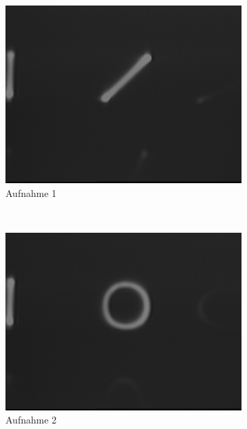 \documentclass[bigchapter,colorback,accentcolor=tud4b,linedtoc,11pt]{tudreport}
\begin{document}
\begin{figure}[H]
  \centering
  \begin{subfigure}[h]{0.32\textwidth}
    \includegraphics[width=\textwidth]{data/Aufgabe7/1-1-0.png}
    \caption[Cap for listoffigures]{Aufnahme 1}
  \end{subfigure}~%
  \begin{subfigure}[h]{0.32\textwidth}
    \includegraphics[width=\textwidth]{data/Aufgabe7/1-1-90.png}
    \caption[Cap for listoffigures]{Aufnahme 2}
  \end{subfigure}~%
  \begin{subfigure}[h]{0.32\textwidth}

\end{subfigure}
\end{figure}
\end{document}
